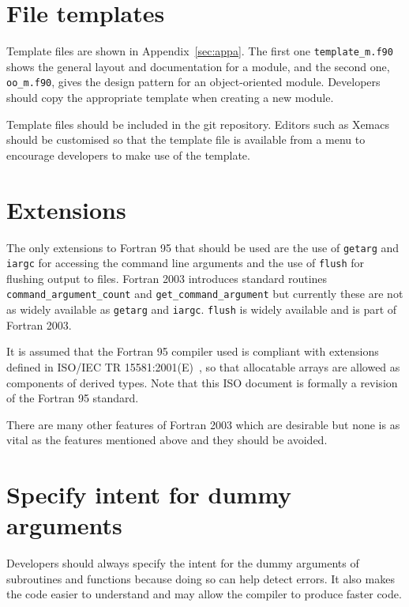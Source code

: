 \documentclass[11pt,twoside,a4paper]{report}
\begin{document}
\section{File templates}
Template files are shown in Appendix~\ref{sec:appa}. The first one
\verb+template_m.f90+ shows the general layout and documentation for a
module, and the second one, \verb+oo_m.f90+, gives the design pattern
for an object-oriented module. Developers should copy the appropriate
template when creating a new module.  %

Template files should be included in the git repository.
Editors such as Xemacs should be customised so that the template file
is available from a menu to encourage developers to make use of the
template.

\section{Extensions}

The only extensions to Fortran 95 that should be used are the use of
\verb|getarg| and \verb|iargc| for accessing the command line
arguments and the use of \verb|flush| for flushing output to files.
 Fortran 2003 introduces standard 
routines \verb|command_argument_count| and \verb|get_command_argument|
but currently these are not as widely available as \verb|getarg| and
\verb|iargc|. \verb|flush| is widely available and is part of Fortran
2003.

It is assumed that the Fortran 95 compiler used is compliant with
extensions defined in ISO/IEC TR 15581:2001(E)~\cite{tr15581}, so that
allocatable arrays are allowed as components of derived types. Note
that this ISO document is formally a revision of the Fortran 95
standard.

There are many other features of Fortran 2003 which are
desirable but none is as vital as the features mentioned above and
they should be avoided.



\section{Specify intent for dummy arguments}

Developers should always specify the intent for the dummy arguments of
subroutines and functions because doing so can help detect errors. It
also makes the code easier to understand and may allow the compiler to
produce faster code.
\end{document}
